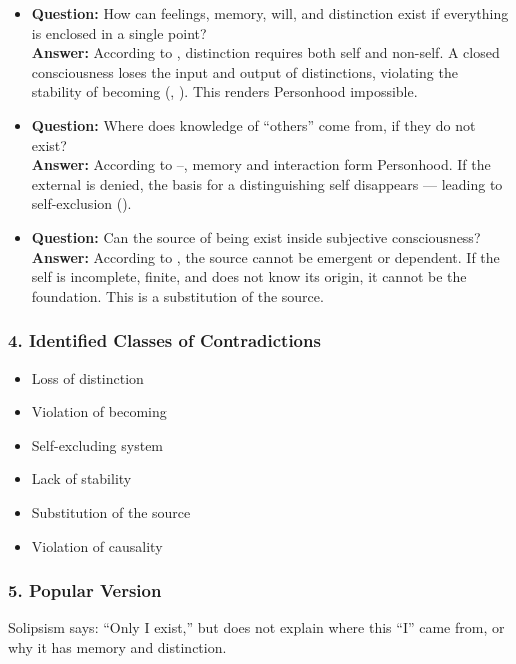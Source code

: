 \documentclass[12pt]{article}
\begin{document}
\begin{itemize}
\item \textbf{Question:} How can feelings, memory, will, and distinction exist if everything is enclosed in a single point?  
\\ \textbf{Answer:} According to \text{[9]}, distinction requires both self and non-self. A closed consciousness loses the input and output of distinctions, violating the stability of becoming (\text{[7]}, \text{[4.4]}). This renders Personhood impossible.

\item \textbf{Question:} Where does knowledge of ``others'' come from, if they do not exist?  
\\ \textbf{Answer:} According to \text{[10.3]}–\text{[10.5]}, memory and interaction form Personhood. If the external is denied, the basis for a distinguishing self disappears — leading to self-exclusion (\text{[11.4]}).

\item \textbf{Question:} Can the source of being exist inside subjective consciousness?  
\\ \textbf{Answer:} According to \text{[6]}, the source cannot be emergent or dependent. If the self is incomplete, finite, and does not know its origin, it cannot be the foundation. This is a substitution of the source.
\end{itemize}

\subsubsection*{4. Identified Classes of Contradictions}

\begin{itemize}
\item Loss of distinction
\item Violation of becoming
\item Self-excluding system
\item Lack of stability
\item Substitution of the source
\item Violation of causality
\end{itemize}

\subsubsection*{5. Popular Version}

Solipsism says: ``Only I exist,'' but does not explain where this ``I'' came from, or why it has memory and distinction.
\end{document}
